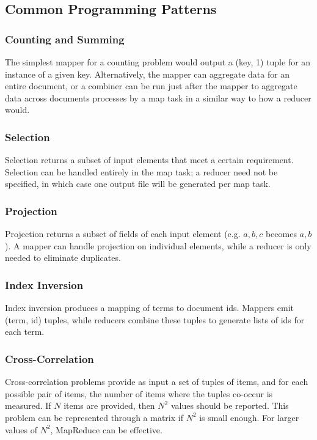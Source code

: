 \documentclass[12pt,titlepage]{article}
\begin{document}
    \subsection{Common Programming Patterns}

      \subsubsection{Counting and Summing}
        The simplest mapper for a counting problem would output a (key, 1) tuple for an instance of a given key. Alternatively, the mapper can aggregate data for an
        entire document, or a combiner can be run just after the mapper to aggregate data across documents processes by a map task in a similar way to how a reducer
        would.

      \subsubsection{Selection}
        Selection returns a subset of input elements that meet a certain requirement. Selection can be handled entirely in the map task; a reducer need not be
        specified, in which case one output file will be generated per map task.

      \subsubsection{Projection}
        Projection returns a subset of fields of each input element (e.g. $a,b,c$ becomes $a,b$). A mapper can handle projection on individual elements, while a
        reducer is only needed to eliminate duplicates.

      \subsubsection{Index Inversion}
        Index inversion produces a mapping of terms to document ids. Mappers emit (term, id) tuples, while reducers combine these tuples to generate lists of ids
        for each term.

      \subsubsection{Cross-Correlation}
        Cross-correlation problems provide as input a set of tuples of items, and for each possible pair of items, the number of items where the tuples co-occur is
        measured. If $N$ items are provided, then $N^2$ values should be reported. This problem can be represented through a matrix if $N^2$ is small enough.
        For larger values of $N^2$, MapReduce can be effective.
\end{document}
